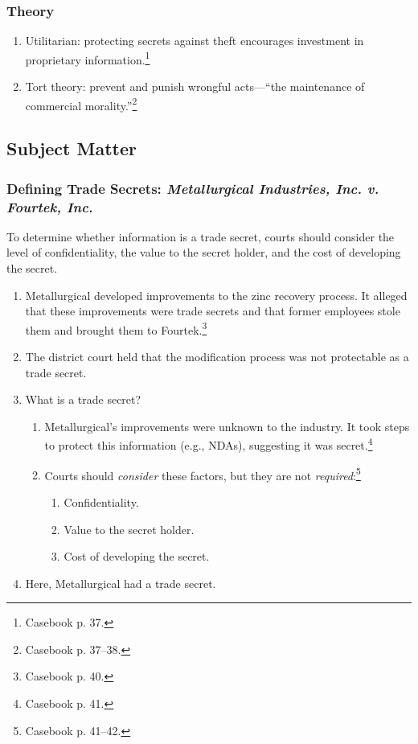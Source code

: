 \subsubsection{Theory}

\begin{enumerate}
    \item Utilitarian: protecting secrets against theft encourages investment 
    in proprietary information.\footnote{Casebook p. 37.}
    \item Tort theory: prevent and punish wrongful acts---``the maintenance of 
    commercial morality.''\footnote{Casebook p.  37--38.}
\end{enumerate}

\subsection{Subject Matter}

\subsubsection{Defining Trade Secrets: \emph{Metallurgical Industries, Inc. v. 
Fourtek, Inc.}}

To determine whether information is a trade secret, courts should consider the 
level of confidentiality, the value to the secret holder, and the cost of 
developing the secret.

\begin{enumerate}
    \item Metallurgical developed improvements to the zinc recovery process. 
    It alleged that these improvements were trade secrets and that former 
    employees stole them and brought them to Fourtek.\footnote{Casebook p. 40.}
    \item The district court held that the modification process was not 
    protectable as a trade secret.
    \item What is a trade secret?
    \begin{enumerate}
        \item Metallurgical's improvements were unknown to the industry. It 
        took steps to protect this information (e.g., NDAs), suggesting it was 
        secret.\footnote{Casebook p. 41.}
        \item Courts should \emph{consider} these factors, but they are not 
        \emph{required}:\footnote{Casebook p. 41--42.}
        \begin{enumerate}
            \item Confidentiality.
            \item Value to the secret holder.
            \item Cost of developing the secret.
        \end{enumerate}
    \end{enumerate}
    \item Here, Metallurgical had a trade secret.
\end{enumerate}

